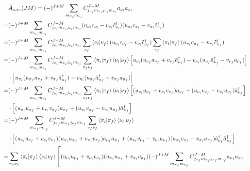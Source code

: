 \documentclass[master]{shnuthesis}
\begin{document}
\begin{align}
    & \tilde{A}_{\pi_i\nu_i}(JM) = (-)^{J+M} \sum_{m_{\pi_i}m_{\nu_i}} C_{j_{\pi_i} m_{\pi_i} j_{\nu_i} m_{\nu_i}}^{J-M} a_{\nu_i} a_{\pi_i} \notag\\
    = & (-)^{J+M} \sum_{m_{\pi_i}m_{\nu_i}} C_{j_{\pi_i} m_{\pi_i} j_{\nu_i} m_{\nu_i}}^{J-M} (u_{\nu_i}c_{\nu_i}-v_{\nu_i}\tilde{c}_{\nu_i}^\dagger) (u_{\pi_i}c_{\pi_i}-v_{\pi_i}\tilde{c}_{\pi_i}^\dagger) \notag\\
    = & (-)^{J+M} \sum_{m_{\pi_i}m_{\nu_i}} C_{j_{\pi_i} m_{\pi_i} j_{\nu_i} m_{\nu_i}}^{J-M} \sum_{\nu_f}\left\langle \nu_i|\nu_f \right\rangle(u_{\nu_i}c_{\nu_f}-v_{\nu_i}\tilde{c}_{\nu_f}^\dagger) \sum_{\pi_f}\left\langle \pi_i|\pi_f \right\rangle(u_{\pi_i}c_{\pi_f}-v_{\pi_i}\tilde{c}_{\pi_f}^\dagger) \notag\\
    = & (-)^{J+M} \sum_{m_{\pi_i}m_{\nu_i}} C_{j_{\pi_i} m_{\pi_i} j_{\nu_i} m_{\nu_i}}^{J-M} \sum_{\pi_f \nu_f}\left\langle \pi_i|\pi_f \right\rangle\left\langle \nu_i|\nu_f \right\rangle \left[u_{\nu_i}(u_{\nu_f}a_{\nu_f}+v_{\nu_f}\tilde{a}_{\nu_f}^\dagger)-v_{\nu_i}(u_{\nu_f}\tilde{a}_{\nu_f}^\dagger-v_{\nu_f}a_{\nu_f})\right] \notag\\
    & \cdot \left[u_{\pi_i}(u_{\pi_f}a_{\pi_f}+v_{\pi_f}\tilde{a}_{\pi_f}^\dagger)-v_{\pi_i}(u_{\pi_f}\tilde{a}_{\pi_f}^\dagger-v_{\pi_f}a_{\pi_f})\right] \notag\\
    = & (-)^{J+M} \sum_{m_{\pi_i}m_{\nu_i}} C_{j_{\pi_i} m_{\pi_i} j_{\nu_i} m_{\nu_i}}^{J-M} \sum_{\pi_f \nu_f}\left\langle \pi_i|\pi_f \right\rangle\left\langle \nu_i|\nu_f \right\rangle \left[(u_{\nu_i}u_{\nu_f}+v_{\nu_i}v_{\nu_f})a_{\nu_f}+(u_{\nu_i}v_{\nu_f}-v_{\nu_i}u_{\nu_f})\tilde{a}_{\nu_f}^\dagger\right] \notag\\
    & \cdot \left[(u_{\pi_i}u_{\pi_f}+v_{\pi_i}v_{\pi_f})a_{\pi_f}+(u_{\pi_i}v_{\pi_f}-v_{\pi_i}u_{\pi_f})\tilde{a}_{\pi_f}^\dagger\right] \notag\\
    = & (-)^{J+M} \sum_{m_{\pi_f}m_{\nu_f}} C_{j_{\pi_f} m_{\pi_f} j_{\nu_f} m_{\nu_f}}^{J-M} \sum_{\pi_f \nu_f}\left\langle \pi_i|\pi_f \right\rangle\left\langle \nu_i|\nu_f \right\rangle \notag\\
    & \cdot \left[(u_{\nu_i}u_{\nu_f}+v_{\nu_i}v_{\nu_f})(u_{\pi_i}u_{\pi_f}+v_{\pi_i}v_{\pi_f})a_{\nu_f}a_{\pi_f}+(u_{\nu_i}v_{\nu_f}-v_{\nu_i}u_{\nu_f})(u_{\pi_i}v_{\pi_f}-v_{\pi_i}u_{\pi_f})\tilde{a}_{\nu_f}^\dagger\tilde{a}_{\pi_f}^\dagger\right] \notag\\
    = & \sum_{\pi_f \nu_f}\left\langle \pi_i|\pi_f \right\rangle\left\langle \nu_i|\nu_f \right\rangle \left[(u_{\nu_i}u_{\nu_f}+v_{\nu_i}v_{\nu_f})(u_{\pi_i}u_{\pi_f}+v_{\pi_i}v_{\pi_f})(-)^{J+M} \sum_{m_{\pi_f}m_{\nu_f}} C_{j_{\pi_f} m_{\pi_f} j_{\nu_f} m_{\nu_f}}^{J-M} a_{\nu_f}a_{\pi_f}\right. \notag\\

\end{align}
\end{document}
